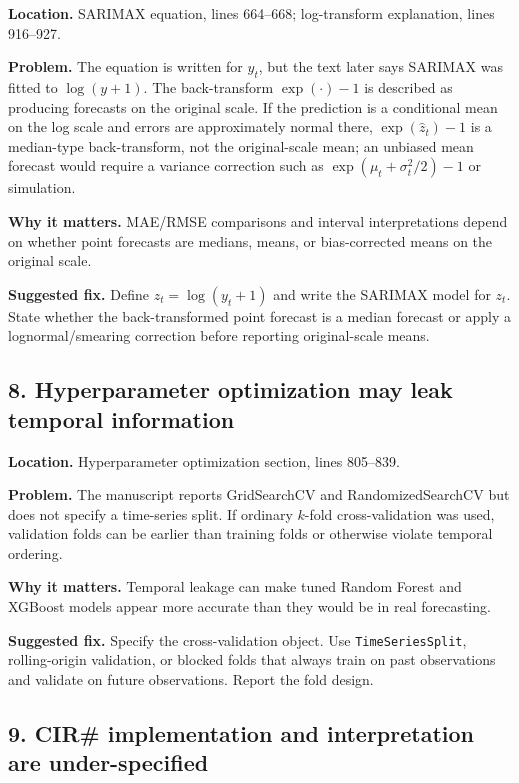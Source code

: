 \documentclass[11pt]{article}
\begin{document}
\textbf{Location.} SARIMAX equation, lines 664--668; log-transform explanation, lines 916--927.

\textbf{Problem.} The equation is written for \(y_t\), but the text later says SARIMAX was fitted to \(\log(y+1)\). The back-transform \(\exp(\cdot)-1\) is described as producing forecasts on the original scale. If the prediction is a conditional mean on the log scale and errors are approximately normal there, \(\exp(\hat z_t)-1\) is a median-type back-transform, not the original-scale mean; an unbiased mean forecast would require a variance correction such as \(\exp(\mu_t + \sigma_t^2/2)-1\) or simulation.

\textbf{Why it matters.} MAE/RMSE comparisons and interval interpretations depend on whether point forecasts are medians, means, or bias-corrected means on the original scale.

\textbf{Suggested fix.} Define \(z_t=\log(y_t+1)\) and write the SARIMAX model for \(z_t\). State whether the back-transformed point forecast is a median forecast or apply a lognormal/smearing correction before reporting original-scale means.

\subsection*{8. Hyperparameter optimization may leak temporal information}

\textbf{Location.} Hyperparameter optimization section, lines 805--839.

\textbf{Problem.} The manuscript reports GridSearchCV and RandomizedSearchCV but does not specify a time-series split. If ordinary \(k\)-fold cross-validation was used, validation folds can be earlier than training folds or otherwise violate temporal ordering.

\textbf{Why it matters.} Temporal leakage can make tuned Random Forest and XGBoost models appear more accurate than they would be in real forecasting.

\textbf{Suggested fix.} Specify the cross-validation object. Use \texttt{TimeSeriesSplit}, rolling-origin validation, or blocked folds that always train on past observations and validate on future observations. Report the fold design.

\subsection*{9. CIR\# implementation and interpretation are under-specified}
\end{document}
